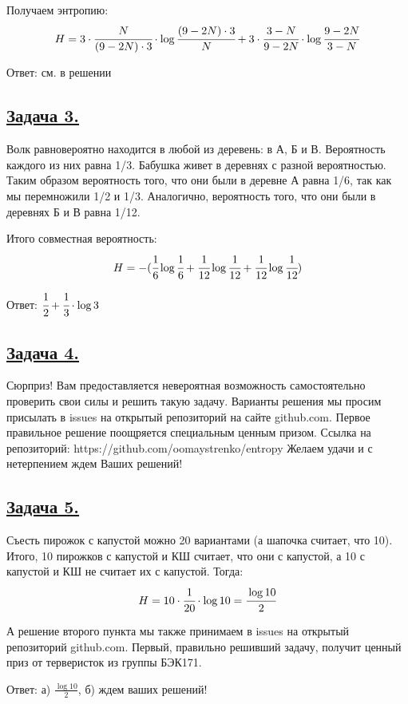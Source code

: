 Получаем энтропию:
\[H=3\cdot \cfrac{N}{(9-2N)\cdot3}\cdot \log \cfrac{(9-2N)\cdot3}{N}+3\cdot\cfrac{3-N}{9-2N}\cdot \log \cfrac{9-2N}{3-N}  \]

Ответ: см. в решении

\subsection*{\hyperref[sec:problem3]{Задача 3.}}\label{sec:sol_problem3}

Волк равновероятно находится в любой из деревень: в А, Б и В. Вероятность каждого из них равна 1/3. 
Бабушка живет в деревнях с разной вероятностью. Таким образом вероятность того, что они были в деревне А равна 1/6, так как мы перемножили 1/2 и 1/3. Аналогично, вероятность того, что они были в деревнях Б и В равна 1/12. 

Итого совместная вероятность:
\[H=-  (\cfrac{1}{6}\log \cfrac{1}{6} + \cfrac{1}{12}\log \cfrac{1}{12} + \cfrac{1}{12}\log \cfrac{1}{12} ) \] 

Ответ: $\cfrac{1}{2} + \cfrac{1}{3}\cdot\log3$

\subsection*{\hyperref[sec:problem4]{Задача 4.}}\label{sec:sol_problem4}

Сюрприз! Вам предоставляется невероятная возможность самостоятельно проверить свои силы и решить такую задачу. Варианты решения мы просим присылать в issues на открытый репозиторий на сайте github.com. Первое правильное решение поощряется специальным ценным призом. 
Ссылка на репозиторий:  https://github.com/oomaystrenko/entropy
Желаем удачи и с нетерпением ждем Ваших решений!

\subsection*{\hyperref[sec:problem5]{Задача 5.}}\label{sec:sol_problem5}
Съесть пирожок с капустой можно 20 вариантами (а шапочка считает, что 10).
Итого, 10 пирожков с капустой и КШ считает, что они с капустой, а 10 с капустой и КШ не считает их с капустой. 
Тогда:
\[H=10\cdot\cfrac{1}{20}\cdot\log10=\cfrac{\log10}{2}\]

А решение второго пункта мы также принимаем в issues на открытый репозиторий github.com. Первый, правильно решивший задачу, получит ценный приз от терверисток из группы БЭК171.

Ответ: а) $\frac{\log10}{2}$, б) ждем ваших решений!

